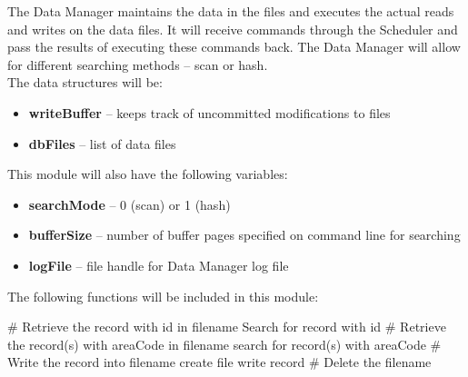 The Data Manager maintains the data in the files and executes the actual reads and writes on the data files. It will receive commands through the Scheduler and pass the results of executing these commands back. The Data Manager will allow for different searching methods -- scan or hash. \\

The data structures will be:

\begin{itemize}
\item \textbf{writeBuffer} -- keeps track of uncommitted modifications to files
\item \textbf{dbFiles} -- list of data files
\end{itemize}

This module will also have the following variables:
\begin{itemize}
\item \textbf{searchMode} -- 0 (scan) or 1 (hash)
\item \textbf{bufferSize} -- number of buffer pages specified on command line for searching
\item \textbf{logFile} -- file handle for Data Manager log file
\end{itemize}

The following functions will be included in this module:\\

\begin{mdframed}
\begin{algorithmic}[H]
	\State  \# Retrieve the record with id in filename
		\EndIf
		\State  Search for record with id
		\EndIf	
	\EndFunction
	\State
	\State \# Retrieve the record(s) with areaCode in filename                                                   
		\EndIf
		\State  search for record(s) with areaCode
		\EndIf	
	\EndFunction
	\State
	\State \# Write the record into filename
			create file
		\EndIf
		\State write record
	\EndFunction
	\State
	\State \# Delete the filename
	\EndFunction

\end{algorithmic} 
\end{mdframed}